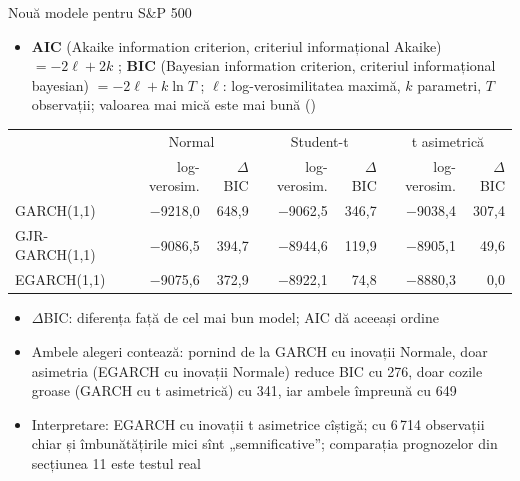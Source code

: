 \begin{frame}{Nouă modele pentru S\&P 500}
\itemsize{\footnotesize}
\begin{itemize}
    \item \textbf{AIC} (Akaike information criterion, criteriul informațional Akaike) $= -2\ell + 2k$ ; \textbf{BIC} (Bayesian information criterion, criteriul informațional bayesian) $= -2\ell + k\ln T$ ; $\ell$: log-verosimilitatea maximă, $k$ parametri, $T$ observații; valoarea mai mică este mai bună ()
\end{itemize}\begin{center}
\scriptsize
\begin{tabular}{lrrrrrr}
\toprule
& \multicolumn{2}{c}{Normal} & \multicolumn{2}{c}{Student-t} & \multicolumn{2}{c}{t asimetrică} \\ & log-verosim. & $\Delta$BIC & log-verosim. & $\Delta$BIC & log-verosim. & $\Delta$BIC \\
\midrule
GARCH(1,1) & \ensuremath{-}9218{,}0 & 648{,}9 & \ensuremath{-}9062{,}5 & 346{,}7 & \ensuremath{-}9038{,}4 & 307{,}4 \\
GJR-GARCH(1,1) & \ensuremath{-}9086{,}5 & 394{,}7 & \ensuremath{-}8944{,}6 & 119{,}9 & \ensuremath{-}8905{,}1 & 49{,}6 \\
EGARCH(1,1) & \ensuremath{-}9075{,}6 & 372{,}9 & \ensuremath{-}8922{,}1 & 74{,}8 & \ensuremath{-}8880{,}3 & 0{,}0 \\
\bottomrule
\end{tabular}
\end{center}
\begin{itemize}
    \item $\Delta$BIC: diferența față de cel mai bun model; AIC dă aceeași ordine
    \item Ambele alegeri contează: pornind de la GARCH cu inovații Normale, doar asimetria (EGARCH cu inovații Normale) reduce BIC cu 276, doar cozile groase (GARCH cu t asimetrică) cu 341, iar ambele împreună cu 649
    \item Interpretare: EGARCH cu inovații t asimetrice cîștigă; cu 6\,714 observații chiar și îmbunătățirile mici sînt „semnificative”; comparația prognozelor din secțiunea 11 este testul real
\end{itemize}
\end{frame}


